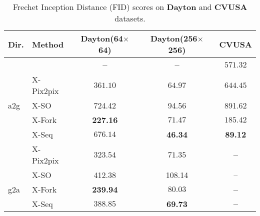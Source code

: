 \documentclass[times,twocolumn,final,authoryear]{elsarticle_modified}
\begin{document}
\begin{table}[t]
 \small
  \centering
  \renewcommand{\arraystretch}{.6}
  \renewcommand{\tabcolsep}{.45mm}  
  
  \caption{\small Frechet Inception Distance (FID) scores on {\bf Dayton} and {\bf CVUSA} datasets.}
  \vspace{-10pt}
  \label{tab:fid}
    \begin{tabular}{llccc}
        \toprule
       \textbf{Dir.} & \textbf{Method} & \textbf{Dayton(64$\times$64)} & \textbf{Dayton(256$\times$256)} & \textbf{CVUSA}\\
        \midrule
        & \cite{zhai2017crossview} & \textbf{--} & \textbf{--} & $ 571.32 $\\
        & X-Pix2pix & $ 361.10 $ & $ 64.97 $ &   $ 644.45 $\\
    a2g & X-SO &  724.42  & 94.56 & 891.62   \\  
 & X-Fork &   \textbf{227.16} & $ 71.47 $ &  $ 185.42 $
\\
    & X-Seq & $ 676.14 $ & \textbf{46.34} & \textbf{89.12} \\
    \midrule 
    & X-Pix2pix & $ 323.54 $ & $ 71.35 $ &   \textbf{--} \\
         & X-SO & 412.38 & 108.14 &   --\\  

    g2a & X-Fork &   \textbf{239.94} & $ 80.03 $ & \textbf{--}
\\
    & X-Seq & $ 388.85 $ & \textbf{69.73} & \textbf{--}\\
        \bottomrule


    \end{tabular}
\end{table}
\end{document}
